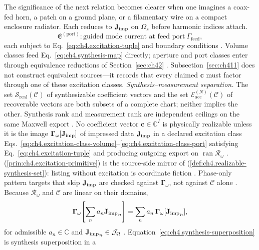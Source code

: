 The significance of the next relation becomes clearer when one imagines a coax-fed horn, a patch on a ground plane, or a filamentary wire on a compact enclosure radiator. Each reduces to $\mathbf{J}_{\mathrm{imp}}$ on $\Omega_s$ before harmonic indices attach. \cite{stratton1941}
\begin{equation}
\label{eq:ch4.excitation-class-port}
\mathfrak{E}^{(\mathrm{port})}:
\text{guided mode current at feed port}\ \Gamma_{\mathrm{feed}},
\end{equation}
each subject to Eq.~\eqref{eq:ch4.excitation-tuple} and boundary conditions
\cite{stratton1941}. Volume classes feed Eq.~\eqref{eq:ch4.synthesis-map}
directly; aperture and port classes enter through equivalence reductions of Section~\ref{sec:ch42}
\cite{harrington2001}. Subsection~\ref{sec:ch411} does not construct equivalent sources---it
records that every claimed \(\mathbf{c}\) must factor through one of these excitation classes.
\label{prin:ch4.excitation-primitive}
\emph{Synthesis--measurement separation.} The set $\mathcal{S}_{\mathrm{real}}(\mathcal{C})$ of synthesizable coefficient vectors and the set $\mathcal{E}_{\mathrm{acc}}^{(N)}(\mathcal{C})$ of recoverable vectors are both subsets of a complete chart; neither implies the other. Synthesis rank and measurement rank are independent ceilings on the same Maxwell export \cite{stratton1941}.
No coefficient vector \(\mathbf{c}\in\mathbb{C}^{I}\) is physically realizable unless it is the image
\(\boldsymbol{\Gamma}_\omega[\mathbf{J}_{\mathrm{imp}}]\) of impressed data \(\mathbf{J}_{\mathrm{imp}}\) in a declared excitation class
Eqs.~\eqref{eq:ch4.excitation-class-volume}--\eqref{eq:ch4.excitation-class-port} satisfying
Eq.~\eqref{eq:ch4.excitation-tuple} and producing outgoing export on
\(\operatorname{ran}\mathcal{R}_\omega\) \cite{stratton1941}.
(\ref{prin:ch4.excitation-primitive}) is the source-side mirror of
(\ref{def:ch4.realizable-synthesis-set}): listing without excitation is coordinate fiction
\cite{hansen1988}. Phase-only pattern targets that skip \(\mathbf{J}_{\mathrm{imp}}\) are checked against
\(\boldsymbol{\Gamma}_\omega\), not against \(\mathcal{C}\) alone \cite{harrington2001}.
Because \(\mathcal{R}_\omega\) and \(\mathcal{C}\) are linear on their domains,
\begin{equation}
\label{eq:ch4.synthesis-superposition}
\boldsymbol{\Gamma}_\omega\!\left[\sum_{n}a_{n}{\mathbf{J}_{\mathrm{imp}}}_{n}\right]
=
\sum_{n}a_{n}\,\boldsymbol{\Gamma}_\omega[{\mathbf{J}_{\mathrm{imp}}}_{n}],
\end{equation}
for admissible \(a_{n}\in\mathbb{C}\) and \({\mathbf{J}_{\mathrm{imp}}}_{n}\in\mathcal{J}_\Omega\)
\cite{stratton1941}. Equation~\eqref{eq:ch4.synthesis-superposition} is synthesis superposition in a
